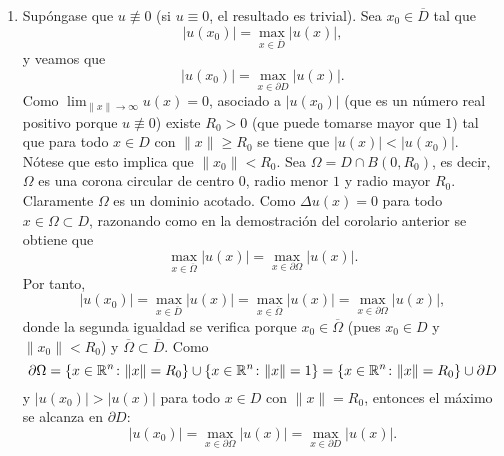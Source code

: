 \documentclass[a4paper, 12pt, extrafontsizes]{memoir}
\begin{document}
\begin{solution}
\begin{enumerate}
\begin{proof}
        \[\max_{x \in \overline{\Omega}} -u(x) = \max_{x \in \partial \Omega} -u(x),\]
        es decir,
        \[\min_{x \in \overline{\Omega}} u(x) = \min_{x \in \partial \Omega} u(x).\]
        En consecuencia,
        \begin{align*}
            \max_{x \in \overline{\Omega}} |u(x)| &= \max\left\{\max_{x \in \overline{\Omega}}u(x),-\min_{x \in \overline{\Omega}}u(x)\right\} = \max\left\{\max_{x \in \partial\Omega}u(x),-\min_{x \in \partial\Omega}u(x)\right\} \\
            &= \max_{x \in \partial \Omega} |u(x)|.
        \end{align*}
        Pero $u(x) = u_1(x)-u_2(x)=\varphi(x)-\varphi(x)=0$ para todo $x \in \partial\Omega$, luego 
        \[\max_{x \in \partial \Omega} |u(x)| = 0,\]
        y por tanto,
        \[\max_{x \in \overline{\Omega}} |u(x)| = 0,\]
        concluyéndose que $u(x) = 0$ para todo $x \in \overline{\Omega}$.
    \end{proof}
    \item Supóngase que $u \not\equiv 0$ (si $u \equiv 0$, el resultado es trivial). Sea $x_0 \in \overline{D}$ tal que
    \[|u(x_0)| = \max_{x \in \overline{D}} |u(x)|,\]
    y veamos que 
    \[ |u(x_0)| =  \max_{x \in \partial D} |u(x)|.\]
    Como $\lim_{\|x\| \to \infty} u(x) = 0$, asociado a $|u(x_0)|$ (que es un número real positivo porque $u \not\equiv 0$) existe $R_0 > 0$ (que puede tomarse mayor que $1$) tal que para todo $x \in D$ con $\|x\| \geq R_0$ se tiene que $|u(x)| < |u(x_0)|$. Nótese que esto implica que $\|x_0\| < R_0$. Sea $\Omega = D \cap B(0,R_0)$, es decir, $\Omega$ es una corona circular de centro $0$, radio menor $1$ y radio mayor $R_0$. Claramente $\Omega$ es un dominio acotado. Como $\Delta u(x) = 0$ para todo $x \in \Omega \subset D$, razonando como en la demostración del corolario anterior se obtiene que
    \[\max_{x \in \overline{\Omega}} |u(x) | = \max_{x \in \partial{ \Omega}} |u(x)|.\]
    Por tanto,
    \[|u(x_0)|= \max_{x \in \overline{D}} |u(x)| = \max_{x \in \overline{\Omega}} |u(x)| =  \max_{x \in \partial{ \Omega}} |u(x)|,\]
    donde la segunda igualdad se verifica porque $x_0 \in \overline{\Omega}$ (pues $x_0 \in D$ y $\|x_0\| < R_0$) y $\overline{\Omega} \subset \overline{D}$. Como
    \[\partial\Omega = \{x \in \mathbb R^n \colon \|x\| = R_0\} \cup \{x \in \mathbb R^n \colon \|x\| = 1\} = \{x \in \mathbb R^n \colon \|x\| = R_0\} \cup \partial D\]
    y $|u(x_0)| > |u(x)|$ para todo $x \in D$ con $\|x\| = R_0$, entonces el máximo se alcanza en $\partial D$:
    \[|u(x_0)|= \max_{x \in \partial{ \Omega}} |u(x)| =  \max_{x \in \partial{ D}} |u(x)|.\]

\end{enumerate}
\end{solution}
\end{document}
